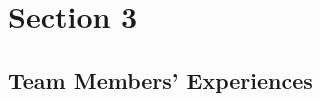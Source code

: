 \documentclass[xcolor={usenames,dvipsnames},hyperref={hyperindex,bookmarks}]{beamer}
\begin{document}



%		
%			
%			
%			



\section{Section 3}


\subsection{Team Members' Experiences}
\end{document}
